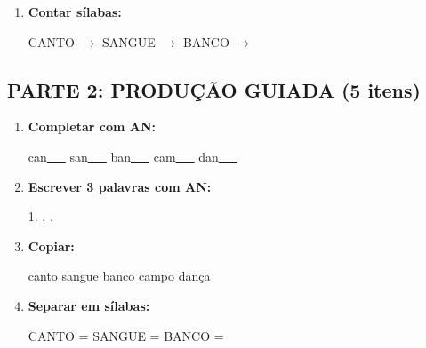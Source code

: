 \begin{exercicio}
\begin{enumerate}
  \item \textbf{Contar sílabas:}
  \begin{center}
  CANTO $\rightarrow$ \underline{\hspace{0.9cm}} \quad SANGUE $\rightarrow$ \underline{\hspace{0.9cm}} \quad BANCO $\rightarrow$ \underline{\hspace{0.9cm}}
  \end{center}

\end{enumerate}

\subsection*{PARTE 2: PRODUÇÃO GUIADA (5 itens)}

\begin{enumerate}[resume]

  \item \textbf{Completar com AN:}
  \begin{center}
  can\underline{~~~} \quad san\underline{~~~} \quad ban\underline{~~~} \quad cam\underline{~~~} \quad dan\underline{~~~}
  \end{center}

  \item \textbf{Escrever 3 palavras com AN:}
  \begin{center}
  1. \underline{\hspace{3cm}} . \underline{\hspace{3cm}} . \underline{\hspace{3cm}}
  \end{center}

  \item \textbf{Copiar:}
  \begin{center}
  canto \quad sangue \quad banco \quad campo \quad dança
  \end{center}

  \item \textbf{Separar em sílabas:}
  \begin{center}
  CANTO = \underline{\hspace{1cm}} \underline{\hspace{1cm}} \quad SANGUE = \underline{\hspace{1cm}} \underline{\hspace{1cm}} \quad BANCO = \underline{\hspace{1cm}} \underline{\hspace{1cm}}
  \end{center}


\end{enumerate}
\end{exercicio}
